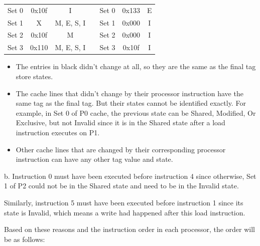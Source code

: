 \documentclass[12pt]{article}
\begin{document}
\begin{table}[H]
\begin{tabular}{ccclccc}
		\multicolumn{1}{|c|}{Set 0} & \multicolumn{1}{c|}{0x10f} & \multicolumn{1}{c|}{I}          & \multicolumn{1}{l|}{} & \multicolumn{1}{c|}{Set 0} & \multicolumn{1}{c|}{0x133} & \multicolumn{1}{c|}{E}          \\ \cline{1-3} \cline{5-7} 
		\multicolumn{1}{|c|}{Set 1} & \multicolumn{1}{c|}{X}     & \multicolumn{1}{c|}{M, E, S, I} & \multicolumn{1}{l|}{} & \multicolumn{1}{c|}{Set 1} & \multicolumn{1}{c|}{0x000} & \multicolumn{1}{c|}{I}          \\ \cline{1-3} \cline{5-7} 
		\multicolumn{1}{|c|}{Set 2} & \multicolumn{1}{c|}{0x10f} & \multicolumn{1}{c|}{M}          & \multicolumn{1}{l|}{} & \multicolumn{1}{c|}{Set 2} & \multicolumn{1}{c|}{0x000} & \multicolumn{1}{c|}{I}          \\ \cline{1-3} \cline{5-7} 
		\multicolumn{1}{|c|}{Set 3} & \multicolumn{1}{c|}{0x110} & \multicolumn{1}{c|}{M, E, S, I} & \multicolumn{1}{l|}{} & \multicolumn{1}{c|}{Set 3} & \multicolumn{1}{c|}{0x10f} & \multicolumn{1}{c|}{I}          \\ \cline{1-3} \cline{5-7} 
	\end{tabular}
\end{table}

\begin{itemize}
	\item The entries in black didn't change at all, so they are the same as the final tag store states.
	
	\item The cache lines that didn't change by their processor instruction have the same tag as the final tag. But their states cannot be identified exactly. For example, in Set 0 of P0 cache, the previous state can be Shared, Modified, Or Exclusive, but not Invalid since it is in the Shared state after a load instruction executes on P1. 
	
	\item Other cache lines that are changed by their corresponding processor instruction can have any other tag value and state.
\end{itemize}


b. Instruction 0 must have been executed before instruction 4 since otherwise, Set 1 of P2 could not be in the Shared state and need to be in the Invalid state.

Similarly, instruction 5 must have been executed before instruction 1 since its state is Invalid, which means a write had happened after this load instruction.

Based on these reasons and the instruction order in each processor, the order will be as follows:
\end{document}
